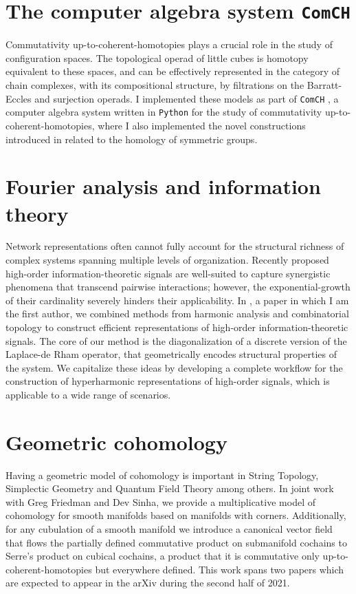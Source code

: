 \documentclass{amsart}
\theoremstyle{definition}
\begin{document}
	\section{The computer algebra system \texttt{ComCH}}
	Commutativity up-to-coherent-homotopies plays a crucial role in the study of configuration spaces.
	The topological operad of little cubes is homotopy equivalent to these spaces, and can be effectively represented in the category of chain complexes, with its compositional structure, by filtrations on the Barratt-Eccles and surjection operads.
	I implemented these models as part of \texttt{ComCH} \cite{medina2021computer}, a computer algebra system written in \texttt{Python} for the study of commutativity up-to-coherent-homotopies, where I also implemented the novel constructions introduced in \cite{medina2020odd} related to the homology of symmetric groups.
	
	\section{Fourier analysis and information theory}	
	Network representations often cannot fully account for the structural richness of complex systems spanning multiple levels of organization.
	Recently proposed high-order information-theoretic signals are well-suited to capture synergistic phenomena that transcend pairwise interactions; however, the exponential-growth of their cardinality severely hinders their applicability.
	In \cite{medina2021hyperharmonic}, a paper in which I am the first author, we combined methods from harmonic analysis and combinatorial topology to construct efficient representations of high-order information-theoretic signals.
	The core of our method is the diagonalization of a discrete version of the Laplace-de Rham operator, that geometrically encodes structural properties of the system.
	We capitalize these ideas by developing a complete workflow for the construction of hyperharmonic representations of high-order signals, which is applicable to a wide range of scenarios.
	
	\section{Geometric cohomology}
	Having a geometric model of cohomology is important in String Topology, Simplectic Geometry and Quantum Field Theory among others.
	In joint work with Greg Friedman and Dev Sinha, we provide a multiplicative model of cohomology for smooth manifolds based on manifolds with corners.
	Additionally, for any cubulation of a smooth manifold we introduce a canonical vector field that flows the partially defined commutative product on submanifold cochains to Serre's product on cubical cochains, a product that it is commutative only up-to-coherent-homotopies but everywhere defined.
	This work spans two papers which are expected to appear in the arXiv during the second half of 2021.
	
\end{document}
